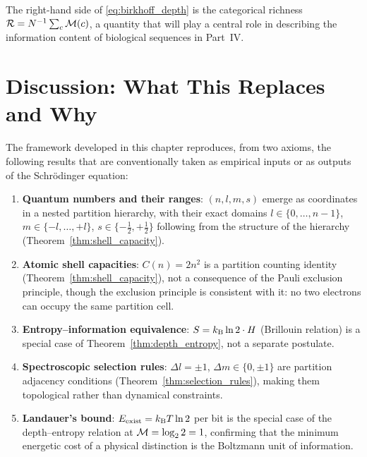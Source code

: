 The right-hand side of \eqref{eq:birkhoff_depth} is the categorical richness
$\mathcal{R} = N^{-1} \sum_c \mathcal{M}(c)$, a quantity that will play a central role
in describing the information content of biological sequences in Part~IV.

\section{Discussion: What This Replaces and Why}
\label{sec:discussion_ch1}

The framework developed in this chapter reproduces, from two axioms, the
following results that are conventionally taken as empirical inputs or as
outputs of the Schr\"{o}dinger equation:

\begin{enumerate}[label=(\arabic*)]
  \item \textbf{Quantum numbers and their ranges}: $(n, l, m, s)$ emerge as
        coordinates in a nested partition hierarchy, with their exact domains
        $l \in \{0, \ldots, n-1\}$, $m \in \{-l, \ldots, +l\}$,
        $s \in \{-\tfrac{1}{2}, +\tfrac{1}{2}\}$ following from the structure
        of the hierarchy (Theorem~\ref{thm:shell_capacity}).

  \item \textbf{Atomic shell capacities}: $C(n) = 2n^2$ is a partition counting
        identity (Theorem~\ref{thm:shell_capacity}), not a consequence of the
        Pauli exclusion principle, though the exclusion principle is consistent
        with it: no two electrons can occupy the same partition cell.

  \item \textbf{Entropy--information equivalence}: $S = k_{\mathrm{B}} \ln 2 \cdot H$
        (Brillouin relation) is a special case of Theorem~\ref{thm:depth_entropy},
        not a separate postulate.

  \item \textbf{Spectroscopic selection rules}: $\Delta l = \pm 1$,
        $\Delta m \in \{0, \pm 1\}$ are partition adjacency conditions
        (Theorem~\ref{thm:selection_rules}), making them topological rather
        than dynamical constraints.

  \item \textbf{Landauer's bound}: $E_{\mathrm{exist}} = k_{\mathrm{B}} T \ln 2$ per bit
        is the special case of the depth--entropy relation at $\mathcal{M} = \log_2 2 = 1$,
        confirming that the minimum energetic cost of a physical distinction is
        the Boltzmann unit of information.
\end{enumerate}


